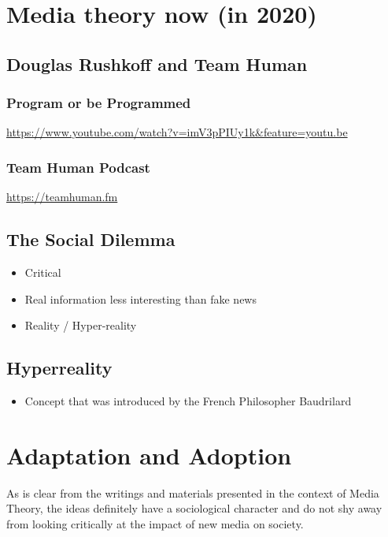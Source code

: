 \documentclass[11pt]{article}
\begin{document}
\section{Media theory now (in 2020)}
\label{sec:orgf23a88e}

\subsection{Douglas Rushkoff and Team Human}
\label{sec:org91e6c7b}
\subsubsection{Program or be Programmed}
\label{sec:org82fac02}
\url{https://www.youtube.com/watch?v=imV3pPIUy1k\&feature=youtu.be}

\subsubsection{Team Human Podcast}
\label{sec:org6bae615}
\url{https://teamhuman.fm}

\subsection{The Social Dilemma}
\label{sec:org03dbd74}
\begin{itemize}
\item Critical
\item Real information less interesting than fake news
\item Reality / Hyper-reality
\end{itemize}

\subsection{Hyperreality}
\label{sec:orgc2e6c50}
\begin{itemize}
\item Concept that was introduced by the French Philosopher Baudrilard
\end{itemize}



\section{Adaptation and Adoption}
\label{sec:orgda8b594}

As is clear from the writings and materials presented in the context of Media Theory,
the ideas definitely have a sociological character and do not shy away from looking 
critically at the impact of new media on society. 
\end{document}
